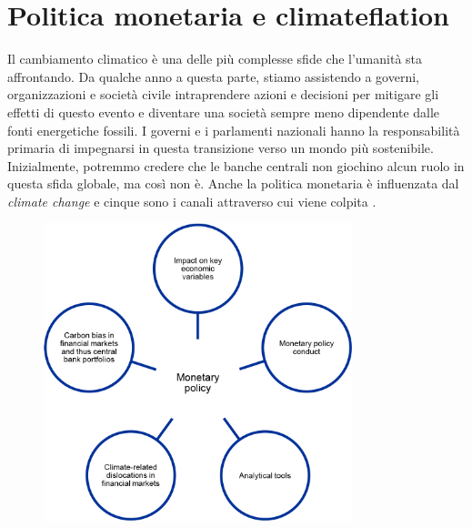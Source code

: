 \section{Politica monetaria e climateflation}

Il cambiamento climatico è una delle più complesse sfide che l'umanità sta affrontando. Da qualche anno a questa parte, stiamo assistendo a governi, organizzazioni e società civile intraprendere azioni e decisioni per mitigare gli effetti di questo evento e diventare una società sempre meno dipendente dalle fonti energetiche fossili. I governi e i parlamenti nazionali hanno la responsabilità primaria di impegnarsi in questa transizione verso un mondo più sostenibile. Inizialmente, potremmo credere che le banche centrali non giochino alcun ruolo in questa sfida globale, ma così non è. Anche la politica monetaria è influenzata dal \textit{climate change} e cinque sono i canali attraverso cui viene colpita \parencite{ECB:to_be_green}.

\begin{figure}[h]
	\centering
	\includegraphics[width=0.80\textwidth]{img/monetary_policy_circle.pdf}
	\caption{}
	\label{img:monetary_policy_circle}
\end{figure}

